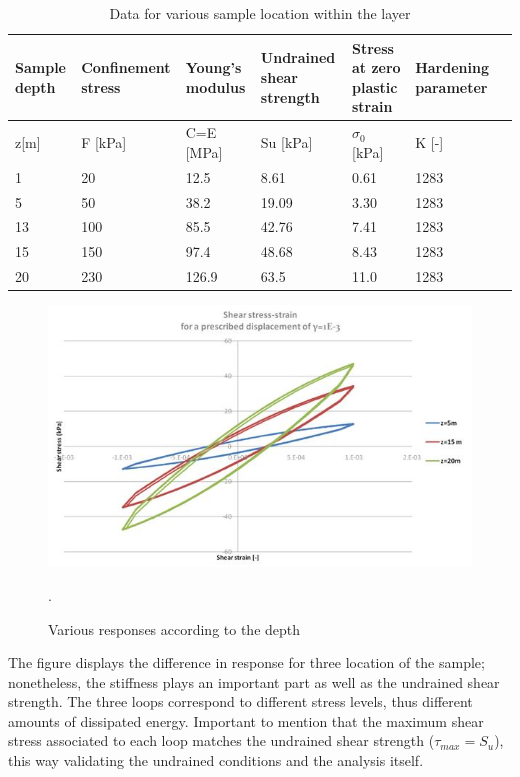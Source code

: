 \documentclass[10pt,a4paper]{report}
\begin{document}
\begin{table}[h!]
	\centering
	\begin{tabular}{|p{2cm}|p{2cm}|p{2cm}| p{3cm}|p{2cm}|p{2cm}|p{2cm}|}
		\hline Sample depth &Confinement stress & Young's modulus  & Undrained shear strength &  Stress at zero plastic strain & Hardening parameter\\
		\hline  z[m]  & F [kPa]  & C=E [MPa] & Su [kPa] & $\sigma_0$ [kPa]  & K [-] \\
		\hline 1    & 20 & 12.5 & 8.61 & 0.61 &  1283 \\ 
		\hline 5  & 50  &  38.2 & 19.09 & 3.30  & 1283\\ 
		\hline 13  &  100  &  85.5  & 42.76 & 7.41  &  1283\\ 
		\hline 15 &  150  &  97.4  & 48.68 & 8.43  & 1283\\ 
		\hline 20 &  230  &    126.9  & 63.5 &  11.0  & 1283 \\ 
		\hline
	\end{tabular}
	\caption{Data for various sample location within the layer}
	\label{Table2}
\end{table}

\begin{figure}[h!]
	\centering
	\includegraphics[width=0.8\linewidth]{"oneElem1"}
	\caption{Various responses according to the depth}
	\label{loops2}.
\end{figure}

The figure displays the difference in response for three location of the sample; nonetheless, the stiffness plays an important part as well as the undrained shear strength. The three loops correspond to different stress levels, thus different amounts of dissipated energy. Important to mention that the maximum shear stress associated to each loop matches the undrained shear strength ($\tau_{max} =S_u$), this way validating the undrained conditions and the analysis itself.
\end{document}

